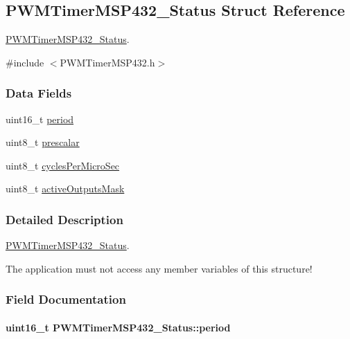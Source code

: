 \subsection{P\+W\+M\+Timer\+M\+S\+P432\+\_\+\+Status Struct Reference}
\label{struct_p_w_m_timer_m_s_p432___status}


\hyperlink{struct_p_w_m_timer_m_s_p432___status}{P\+W\+M\+Timer\+M\+S\+P432\+\_\+\+Status}.  




{\ttfamily \#include $<$P\+W\+M\+Timer\+M\+S\+P432.\+h$>$}

\subsubsection*{Data Fields}
\begin{DoxyCompactItemize}
\item 
uint16\+\_\+t \hyperlink{struct_p_w_m_timer_m_s_p432___status_a83e97e27ba81d7088327e75b936068e8}{period}
\item 
uint8\+\_\+t \hyperlink{struct_p_w_m_timer_m_s_p432___status_a787549c1d11c925c5b47a0d949635a98}{prescalar}
\item 
uint8\+\_\+t \hyperlink{struct_p_w_m_timer_m_s_p432___status_a1f35280490cdb35c9544e19acd0bfec5}{cycles\+Per\+Micro\+Sec}
\item 
uint8\+\_\+t \hyperlink{struct_p_w_m_timer_m_s_p432___status_a5ac617df3b2bf86ebfa46589c06bb3ea}{active\+Outputs\+Mask}
\end{DoxyCompactItemize}


\subsubsection{Detailed Description}
\hyperlink{struct_p_w_m_timer_m_s_p432___status}{P\+W\+M\+Timer\+M\+S\+P432\+\_\+\+Status}. 

The application must not access any member variables of this structure! 

\subsubsection{Field Documentation}
\paragraph[{period}]{\setlength{\rightskip}{0pt plus 5cm}uint16\+\_\+t P\+W\+M\+Timer\+M\+S\+P432\+\_\+\+Status\+::period}\label{struct_p_w_m_timer_m_s_p432___status_a83e97e27ba81d7088327e75b936068e8}
